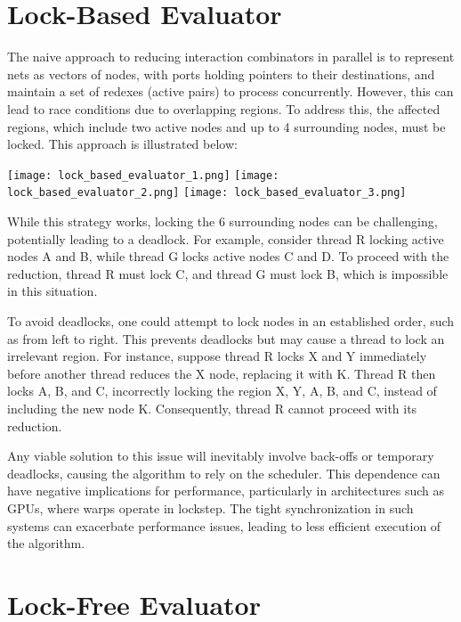 \documentclass{article}
\begin{document}
\section{Lock-Based Evaluator}\label{s:lockfree}

The naive approach to reducing interaction combinators in parallel is to represent nets as vectors of nodes, with ports holding pointers to their destinations, and maintain a set of redexes (active pairs) to process concurrently. However, this can lead to race conditions due to overlapping regions. To address this, the affected regions, which include two active nodes and up to 4 surrounding nodes, must be locked. This approach is illustrated below:

\texttt{[image: lock\_based\_evaluator\_1.png]}
\texttt{[image: lock\_based\_evaluator\_2.png]}
\texttt{[image: lock\_based\_evaluator\_3.png]}

While this strategy works, locking the 6 surrounding nodes can be challenging, potentially leading to a deadlock. For example, consider thread R locking active nodes A and B, while thread G locks active nodes C and D. To proceed with the reduction, thread R must lock C, and thread G must lock B, which is impossible in this situation.

To avoid deadlocks, one could attempt to lock nodes in an established order, such as from left to right. This prevents deadlocks but may cause a thread to lock an irrelevant region. For instance, suppose thread R locks X and Y immediately before another thread reduces the X node, replacing it with K. Thread R then locks A, B, and C, incorrectly locking the region X, Y, A, B, and C, instead of including the new node K. Consequently, thread R cannot proceed with its reduction.

Any viable solution to this issue will inevitably involve back-offs or temporary deadlocks, causing the algorithm to rely on the scheduler. This dependence can have negative implications for performance, particularly in architectures such as GPUs, where warps operate in lockstep. The tight synchronization in such systems can exacerbate performance issues, leading to less efficient execution of the algorithm.

\section{Lock-Free Evaluator}\label{s:lockfree}
\end{document}
